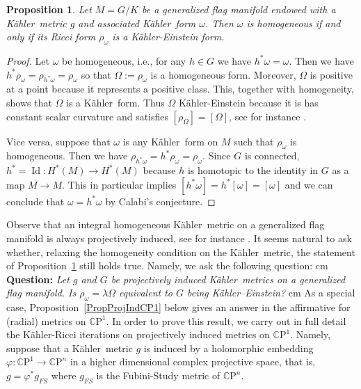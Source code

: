 \documentclass[12pt]{amsart}
\newcommand{\CP}{\mathbb{C}\mathrm{P}}
\newcommand{\K}{K\"{a}hler}
\newcommand{\Id}{\operatorname{Id}}
\newcommand{\lra}{\longrightarrow}
\newtheorem{prop}{Proposition}
\begin{document}
\begin{prop}\label{PropHomogeneous}
	Let $M=G/K$ be a generalized flag manifold endowed with a \K\ metric $g$ and associated \K\ form $\omega$.
	Then $\omega$ is homogeneous if and only if its Ricci form $\rho_\omega$ is a \K-Einstein form.
\end{prop}
\begin{proof}
	Let $\omega$ be homogeneous, i.e., for any $h\in G$ we have $h^*\omega=\omega$.
	Then we have $h^*\rho_\omega=\rho_{h^*\omega}=\rho_\omega$ so that $\Omega:=\rho_\omega$ is a homogeneous form.
	Moreover, $\Omega$ is positive at a point because it represents a positive class.
	This, together with homogeneity, shows that $\Omega$ is a \K\ form.
	Thus  $\Omega$ \K-Einstein because it is has constant scalar curvature and satisfies $[\rho_\Omega]=[\Omega]$, see for instance \cite[Section~2]{Kobayashi67JDGcscK}.
	
	Vice versa, suppose that $\omega$ is any \K\ form on $M$ such that $\rho_\omega$ is homogeneous.
	Then we have $\rho_{h^*\omega}=h^*\rho_\omega=\rho_\omega$.
	Since $G$ is connected, $h^*=\Id:H^*(M)\lra H^*(M)$ because $h$ is homotopic to the identity in $G$ as a map $M\lra M$.
	This in particular implies $[h^*\omega]=h^*[\omega]=[\omega]$ and we can conclude that $\omega=h^*\omega$ by Calabi's conjecture.
\end{proof}

	Observe that an integral homogeneous \K\ metric on a generalized flag manifold is always projectively induced, see for instance \cite{LoiZuddasGromovWidthHKM,Takeuchi78Homogeneous}.
	It seems natural to ask whether, relaxing the homogeneity condition on the \K\ metric, the statement of Proposition~\ref{PropHomogeneous} still holds true. Namely, we ask the following question:
	 cm
	\noindent \textbf{Question:} \emph{Let $g$ and $G$ be projectively induced \K\ metrics on a generalized flag manifold. Is $\rho_\omega=\lambda\Omega$ equivalent to $G$ being \K--Einstein?}
		 cm
	As a special case, Proposition~\ref{PropProjIndCP1} below  gives an answer in the affirmative for  (radial) metrics on $\CP^1$. In order to prove this result, we carry out in full detail the K\"ahler-Ricci iterations on projectively induced metrics on $\CP^1$.
Namely, suppose that a \K\ metric $g$ is induced by a holomorphic embedding $\varphi:\CP^1\lra\CP^n$ in a higher dimensional complex projective space, that is, $g=\varphi^*g_{FS}$ where $g_{FS}$ is the Fubini-Study metric of $\CP^n$.
\end{document}
